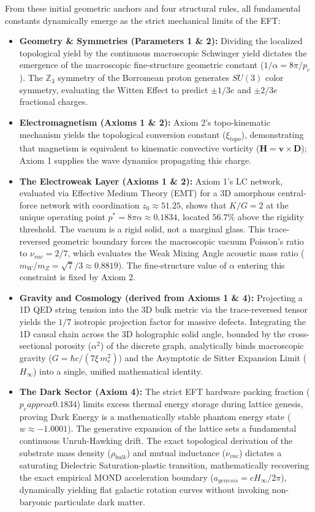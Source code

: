 From these initial geometric anchors and four structural rules, all fundamental constants dynamically emerge as the strict mechanical limits of the EFT:
\begin{itemize}
    \item \textbf{Geometry \& Symmetries (Parameters 1 \& 2):} Dividing the localized topological yield by the continuous macroscopic Schwinger yield dictates the emergence of the macroscopic fine-structure geometric constant ($1/\alpha = 8\pi/p_c$). The $\mathbb{Z}_3$ symmetry of the Borromean proton generates $SU(3)$ color symmetry, evaluating the Witten Effect to predict $\pm 1/3e$ and $\pm 2/3e$ fractional charges.
    \item \textbf{Electromagnetism (Axioms 1 \& 2):} Axiom 2's topo-kinematic mechanism yields the topological conversion constant ($\xi_{topo}$), demonstrating that magnetism is equivalent to kinematic convective vorticity ($\mathbf{H} = \mathbf{v} \times \mathbf{D}$); Axiom 1 supplies the wave dynamics propagating this charge.
    \item \textbf{The Electroweak Layer (Axioms 1 \& 2):} Axiom 1's LC network, evaluated via Effective Medium Theory (EMT) for a 3D amorphous central-force network with coordination $z_0 \approx 51.25$, shows that $K/G = 2$ at the unique operating point $p^* = 8\pi\alpha \approx 0.1834$, located $56.7\%$ above the rigidity threshold. The vacuum is a rigid solid, not a marginal glass. This trace-reversed geometric boundary forces the macroscopic vacuum Poisson's ratio to $\nu_{vac} = 2/7$, which evaluates the Weak Mixing Angle acoustic mass ratio ($m_W / m_Z = \sqrt{7}/3 \approx 0.8819$). The fine-structure value of $\alpha$ entering this constraint is fixed by Axiom 2.
    \item \textbf{Gravity and Cosmology (derived from Axioms 1 \& 4):} Projecting a 1D QED string tension into the 3D bulk metric via the trace-reversed tensor yields the $1/7$ isotropic projection factor for massive defects. Integrating the 1D causal chain across the 3D holographic solid angle, bounded by the cross-sectional porosity ($\alpha^2$) of the discrete graph, analytically binds macroscopic gravity ($G = \hbar c/(7\xi\,m_e^2)$) and the Asymptotic de Sitter Expansion Limit ($H_\infty$) into a single, unified mathematical identity.
    \item \textbf{The Dark Sector (Axiom 4):} The strict EFT hardware packing fraction ($p_c approx 0.1834$) limits excess thermal energy storage during lattice genesis, proving Dark Energy is a mathematically stable phantom energy state ($w \approx -1.0001$). The generative expansion of the lattice sets a fundamental continuous Unruh-Hawking drift. The exact topological derivation of the substrate mass density ($\rho_{bulk}$) and mutual inductance ($\nu_{vac}$) dictates a saturating Dielectric Saturation-plastic transition, mathematically recovering the exact empirical MOND acceleration boundary ($a_{genesis} = c H_\infty / 2\pi$), dynamically yielding flat galactic rotation curves without invoking non-baryonic particulate dark matter.
\end{itemize}

